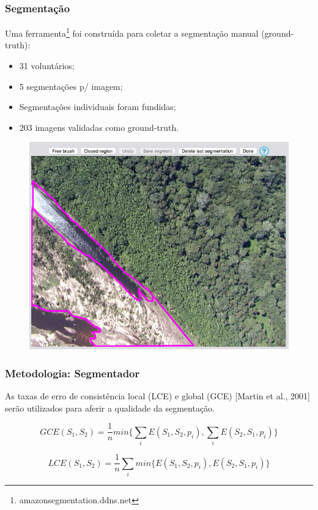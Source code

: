 \documentclass[t]{beamer}
\begin{document}
\begin{frame}[c]
	\frametitle{Segmentação}

	Uma ferramenta\footnote{amazonsegmentation.ddns.net} foi construída para coletar a segmentação manual (ground-truth):


	\begin{minipage}{0.49\linewidth}
		\begin{itemize}
			\item 31 voluntários;
			\item 5 segmentações p/ imagem;
			\item Segmentações individuais foram fundidas;
			\item 203 imagens validadas como ground-truth.
		\end{itemize}
	\end{minipage}
	\begin{minipage}[r]{0.49\linewidth}
		\begin{figure}[h]
			\includegraphics[width=\textwidth]{imgs/manualseg}
		\end{figure}
	\end{minipage}
\end{frame}

\begin{frame}[c]
	\frametitle{Metodologia: Segmentador}

	As taxas de erro de consistência local (LCE) e global (GCE) [Martin et al., 2001] serão utilizados para aferir a qualidade da segmentação.

	\begin{equation*}
		\displaystyle GCE(S_1,S_2) = \frac{1}{n} min \biggl\{ \sum_{i} E(S_1,S_2,p_i), \sum_{i} E(S_2,S_1,p_i) \biggr\}
	\end{equation*}

	\begin{equation*}
		\displaystyle LCE(S_1,S_2) = \frac{1}{n} \sum_{i} min \biggl\{ E(S_1,S_2,p_i), E(S_2,S_1,p_i) \biggr\}
	\end{equation*}
\end{frame}
\end{document}
